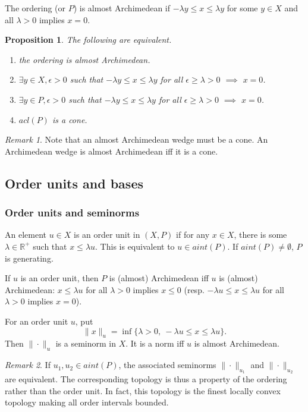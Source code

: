 \documentclass[12pt]{article}
\newtheorem{prop}{Proposition}
\theoremstyle{remark}
\newtheorem{rem}{Remark}
\newcommand{\<}{\langle}
\begin{document}
The ordering (or $P$) is almost Archimedean if $-\lambda y\le x\le \lambda y$ for some $y\in X$ and  all $\lambda> 0$ implies  $x=0$.

\begin{prop}
The following are equivalent.
\begin{enumerate}
\item[(i)] the ordering is almost Archimedean.
\item[(ii)]  $\exists y\in X, \epsilon >0$ such that  $-\lambda y\le x\le \lambda y$ for all $\epsilon\ge \lambda>0$ $\implies$ $x= 0$.
\item[(iii)] $\exists y\in P, \epsilon >0$ such that  $-\lambda y\le x\le \lambda y$ for all $\epsilon\ge \lambda>0$ $\implies$ $x= 0$.
\item[(iv)] $acl(P)$ is a cone.
\end{enumerate}
\end{prop}

\begin{rem}
Note that an almost Archimedean wedge must be a cone. An Archimedean  wedge is almost Archimedean iff it is a cone.
\end{rem}






\subsection{Order units and bases}


\subsubsection*{Order units and seminorms}

 An element $u\in X$ is an order unit in $(X,P)$ if for any $x\in X$, there is some $\lambda\in \mathbb R^+$ such that 
 $x\le \lambda u$. This is equivalent to $u\in aint(P)$. If $aint(P)\ne \emptyset$, $P$ is generating.  

If $u$ is an order unit, then $P$ is (almost) Archimedean iff 
$u$ is (almost) Archimedean: $x\le \lambda u$ for all $\lambda>0$ implies $x\le 0$ (resp. $-\lambda u\le x\le \lambda u$ for all $\lambda>0$ implies $x=0$). 



For an order unit $u$, put
 \[
\|x\|_u=\inf\{\lambda>0,\ -\lambda u\le x\le \lambda u\}.
 \]
Then $\|\cdot\|_u$ is a seminorm in $X$. It is a norm iff  $u$ is almost Archimedean. 

\begin{rem}
If $u_1,u_2\in aint(P)$, the associated seminorms $\|\cdot\|_{u_1}$ and $\|\cdot\|_{u_2}$ are equivalent. The corresponding topology is thus a property of the ordering rather than the order unit. In fact, this topology is the finest locally convex topology 
 making all order intervals bounded.
\end{rem}
 
\end{document}
